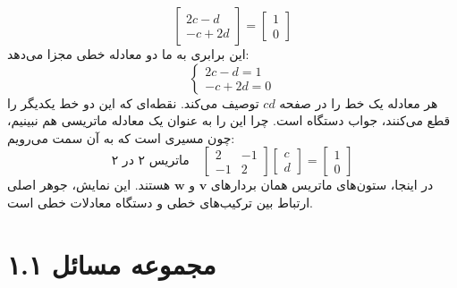 \documentclass[12pt, a4paper]{book}
\begin{document}
	\[ \begin{bmatrix} 2c - d \\ -c + 2d \end{bmatrix} = \begin{bmatrix} 1 \\ 0 \end{bmatrix} \]
	این برابری به ما دو معادله خطی مجزا می‌دهد:
	\[
	\begin{cases}
		2c - d = 1 \\
		-c + 2d = 0
	\end{cases}
	\]
	هر معادله یک خط را در صفحه $cd$ توصیف می‌کند. نقطه‌ای که این دو خط یکدیگر را قطع می‌کنند، جواب دستگاه است.
	چرا این را به عنوان یک معادله ماتریسی هم نبینیم، چون مسیری است که به آن سمت می‌رویم:
	\[ \text{ماتریس ۲ در ۲} \quad \begin{bmatrix} 2 & -1 \\ -1 & 2 \end{bmatrix} \begin{bmatrix} c \\ d \end{bmatrix} = \begin{bmatrix} 1 \\ 0 \end{bmatrix} \]
	در اینجا، ستون‌های ماتریس همان بردارهای $\mathbf{v}$ و $\mathbf{w}$ هستند. این نمایش، جوهر اصلی ارتباط بین ترکیب‌های خطی و دستگاه معادلات خطی است.
	
	\newpage
	\section*{مجموعه مسائل ۱.۱}
	
\end{document}
